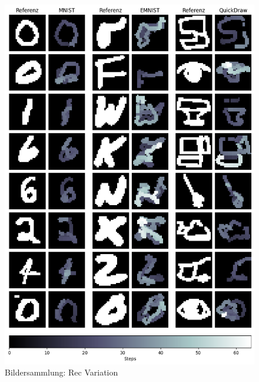 \begin{figure}[!ht]
    \centering
    \includegraphics[width=\textwidth]{images/resultate/rec.png}
    \caption{Bildersammlung: Rec Variation}\label{fig:r-rec}
\end{figure}

\newpage

